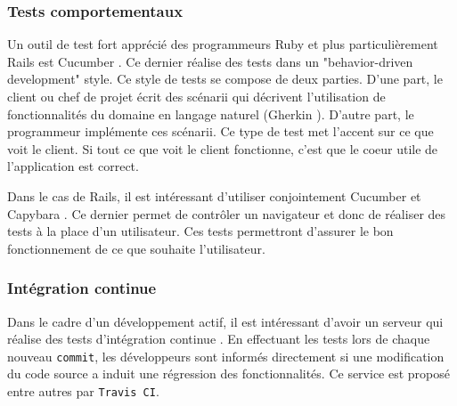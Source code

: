 \subsubsection{Tests comportementaux}
\label{cucumber}
Un outil de test fort apprécié des programmeurs Ruby et plus particulièrement Rails est Cucumber \cite{cucumber}. Ce dernier réalise des tests dans un "behavior-driven development" \cite{wiki-bdd} style. Ce style de tests se compose de deux parties. D'une part, le client ou chef de projet écrit des scénarii qui décrivent l'utilisation de fonctionnalités du domaine en langage naturel (Gherkin \cite{gherkin}). D'autre part, le programmeur implémente ces scénarii. Ce type de test met l'accent sur ce que voit le client. Si tout ce que voit le client fonctionne, c'est que le coeur utile de l'application est correct. 

Dans le cas de Rails, il est intéressant d'utiliser conjointement Cucumber et Capybara \cite{capybara}. Ce dernier permet de contrôler un navigateur et donc de réaliser des tests à la place d'un utilisateur. Ces tests permettront d'assurer le bon fonctionnement de ce que souhaite l'utilisateur.

\subsubsection{Intégration continue}
\label{travis}
Dans le cadre d'un développement actif, il est intéressant d'avoir un serveur qui réalise des tests d'intégration continue \cite{wiki-int-cont}. En effectuant les tests lors de chaque nouveau \texttt{commit}, les développeurs sont informés directement si une modification du code source a induit une régression des fonctionnalités. Ce service est proposé entre autres par \texttt{Travis CI}\cite{travis}.
